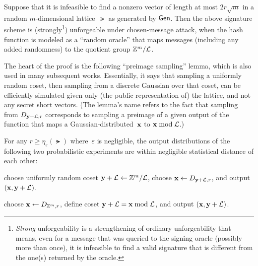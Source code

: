 \documentclass[11pt]{article}
\begin{document}
\begin{theorem}
  \label{thm:gpv-security}
  Suppose that it is infeasible to find a nonzero vector of length at
  most $2r \sqrt{m}$ in a random $m$-dimensional lattice~$\lat$ as
  generated by $\mathsf{Gen}$. Then the above signature scheme is
  (strongly\footnote{\emph{Strong} unforgeability is a strengthening
    of ordinary unforgeability that means, even for a message that was
    queried to the signing oracle (possibly more than once), it is
    infeasible to find a valid signature that is different from the
    one(s) returned by the oracle.}) unforgeable under chosen-message
  attack, when the hash function is modeled as a ``random oracle''
  that maps messages (including any added randomness) to the quotient
  group $\mathbb{Z}^{m}/\mathcal{L}$.
\end{theorem}

The heart of the proof is the following ``preimage sampling'' lemma,
which is also used in many subsequent works. Essentially, it says that
sampling a uniformly random coset, then sampling from a discrete
Gaussian over that coset, can be efficiently simulated given only (the
public representation of) the lattice, and not any secret short
vectors. (The lemma's name refers to the fact that sampling from
$D_{\mathbf{y}+\mathcal{L},r}$ corresponds to sampling a preimage of a given
output of the function that maps a Gaussian-distributed~$\mathbf{x}$ to
$\mathbf{x} \bmod \mathcal{L}$.)

\begin{lemma}
  \label{lem:psf}
  For any $r \geq \eta_{\varepsilon}(\lat)$ where~$\varepsilon$ is
  negligible, the output distributions of the following two
  probabilistic experiments are within negligible statistical distance
  of each other:
  \begin{description}[itemsep=0pt]
  \item[\textbf{REAL:}] choose uniformly random coset
    $\mathbf{y}+\mathcal{L} \gets \mathbb{Z}^{m}/\mathcal{L}$, choose
    $\mathbf{x} \gets D_{\mathbf{y}+\mathcal{L},r}$, and output $(\mathbf{x},\mathbf{y}+\mathcal{L})$.
  \item[\textbf{SIM:}] choose $\mathbf{x} \gets D_{\mathbb{Z}^{m},r}$,
    define coset $\mathbf{y}+\mathcal{L} = \mathbf{x} \bmod \mathcal{L}$, and output
    $(\mathbf{x},\mathbf{y}+\mathcal{L})$.
  \end{description}
\end{lemma}
\end{document}
